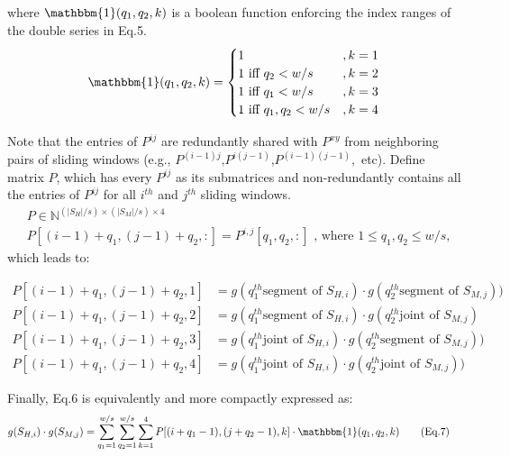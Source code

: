 \documentclass[english]{article}
\begin{document}
where $\mathbbm{1}(q_1,q_2,k)$ is a boolean function enforcing the index ranges of the double series in Eq.5.
\begin{align*}
\mathbbm{1}(q_1,q_2,k) = \begin{cases}
1 &, k=1\\
1\text{ iff }q_2<w/s &, k=2 \\
1\text{ iff }q_1<w/s &, k=3\\
1\text{ iff }q_1,q_2<w/s &, k=4 
\end{cases}
\end{align*}

Note that the entries of $P^{ij}$ are redundantly shared with $P^{xy}$ from neighboring pairs of sliding windows (e.g., $P^{(i-1)j}$,$P^{i(j-1)}$,$P^{(i-1)(j-1)},$ etc). Define matrix $P$, which has every $P^{ij}$ as its submatrices and  non-redundantly contains all the entries of $P^{ij}$ for all  $i^{th}$ and $j^{th}$ sliding windows. \newline
\begin{align*}
    &P \in \mathbb{N}^{(|S_H|/s)\times (|S_M|/s)\times 4} \\
    &P[(i-1)+q_1,(j-1)+q_2,:] =P^{i,j}[q_1,q_2,:] \text{ ,  where }1\leq q_1,q_2 \leq w/s,
\end{align*}
which leads to:  

\begin{align*}
    P[(i-1)+q_1,(j-1)+q_2,1] &=  g(q_1^{th} \text{segment of $S_{H,i}$}) \cdot g(q_2^{th} \text{segment of $S_{M,j}$})) \\
    P[(i-1)+q_1,(j-1)+q_2,2] &= g(q_1^{th} \text{segment of $S_{H,i}$}) \cdot g(q_2^{th} \text{joint of $S_{M,j}$}) \\
    P[(i-1)+q_1,(j-1)+q_2,3] &= g(q_1^{th} \text{joint of $S_{H,i}$}) \cdot g(q_2^{th} \text{segment of $S_{M,j}$})) \\
    P[(i-1)+q_1,(j-1)+q_2,4] &= g(q_1^{th} \text{joint of $S_{H,i}$}) \cdot g(q_2^{th} \text{joint of $S_{M,j}$}))
    \end{align*}

Finally, Eq.6 is equivalently and more compactly expressed as:
\begin{align*}
g(S_{H,i})\cdot g(S_{M,j}) &= \sum_{q_1=1}^{w/s}\sum_{q_2=1}^{w/s} \sum_{k=1}^4 P[(i+q_1-1), (j+q_2-1), k]\cdot \mathbbm{1}(q_1,q_2,k) \tag{Eq.7}
\end{align*}
\end{document}
